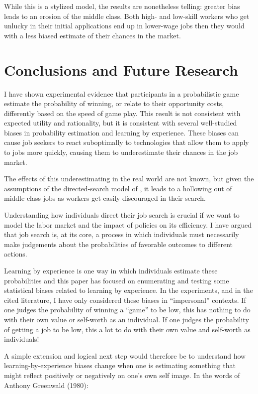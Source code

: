 \documentclass[a4paper,12pt]{article}
\begin{document}
While this is a stylized model, the results are nonetheless telling: greater bias leads to an erosion of the middle class. Both high- and low-skill workers who get unlucky in their initial applications end up in lower-wage jobs then they would with a less biased estimate of their chances in the market.

\section{ Conclusions and Future Research }

I have shown experimental evidence that participants in a probabilistic game estimate the probability of winning, or relate to their opportunity costs, differently based on the speed of game play. This result is not consistent with expected utility and rationality, but it is consistent with several well-studied biases in probability estimation and learning by experience. These biases can cause job seekers to react suboptimally to technologies that allow them to apply to jobs more quickly, causing them to underestimate their chances in the job market.

The effects of this underestimating in the real world are not known, but given the assumptions of the directed-search model of \cite{gonzalez2010}, it leads to a hollowing out of middle-class jobs as workers get easily discouraged in their search.

Understanding how individuals direct their job search is crucial if we want to model the labor market and the impact of policies on its efficiency. I have argued that job search is, at its core, a process in which individuals must necessarily make judgements about the probabilities of favorable outcomes to different actions.

Learning by experience is one way in which individuals estimate these probabilities and this paper has focused on enumerating and testing some statistical biases related to learning by experience. In the experiments, and in the cited literature, I have only considered these biases in ``impersonal'' contexts. If one judges the probability of winning a ``game'' to be low, this has nothing to do with their own value or self-worth as an individual. If one judges the probability of getting a job to be low, this a lot to do with their own value and self-worth as individuals!

A simple extension and logical next step would therefore be to understand how learning-by-experience biases change when one is estimating something that might reflect positively or negatively on one's own self image. In the words of Anthony Greenwald (1980):
\end{document}
